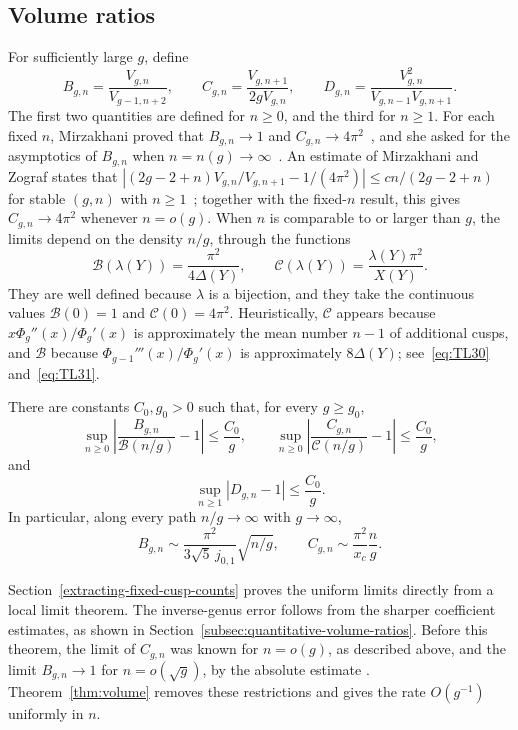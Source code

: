 \subsection{Volume ratios}\label{subsec:intro-ratios}
For sufficiently large $g$, define
\[
 B_{g,n}=\frac{V_{g,n}}{V_{g-1,n+2}},\qquad
 C_{g,n}=\frac{V_{g,n+1}}{2gV_{g,n}},\qquad
 D_{g,n}=\frac{V_{g,n}^2}{V_{g,n-1}V_{g,n+1}}.
\]
The first two quantities are defined for $n\ge0$, and the third for $n\ge1$. For each fixed $n$, Mirzakhani proved that $B_{g,n}\to1$ and $C_{g,n}\to4\pi^2$~\cite[Theorem~3.5]{Mir}, and she asked for the asymptotics of $B_{g,n}$ when $n=n(g)\to\infty$~\cite[Section~1.4]{Mir}. An estimate of Mirzakhani and Zograf states that $|(2g-2+n)V_{g,n}/V_{g,n+1}-1/(4\pi^2)|\le cn/(2g-2+n)$ for stable $(g,n)$ with $n\ge1$~\cite[Lemma~5.1]{MZ}; together with the fixed-$n$ result, this gives $C_{g,n}\to4\pi^2$ whenever $n=o(g)$. When $n$ is comparable to or larger than $g$, the limits depend on the density $n/g$, through the functions
\begin{equation}
 \mathcal B(\lambda(Y))=\frac{\pi^2}{4\Delta(Y)},\qquad
 \mathcal C(\lambda(Y))=\frac{\lambda(Y)\pi^2}{X(Y)}.
 \label{eq:SP3}
\end{equation}
They are well defined because $\lambda$ is a bijection, and they take the continuous values $\mathcal B(0)=1$ and $\mathcal C(0)=4\pi^2$. Heuristically, $\mathcal C$ appears because $x\Phi_g''(x)/\Phi_g'(x)$ is approximately the mean number $n-1$ of additional cusps, and $\mathcal B$ because $\Phi_{g-1}'''(x)/\Phi_g'(x)$ is approximately $8\Delta(Y)$; see~\eqref{eq:TL30} and~\eqref{eq:TL31}.

\begin{mainresult}
\begin{theorem}\label{thm:volume}
There are constants $C_0,g_0>0$ such that, for every $g\ge g_0$,
\[
 \sup_{n\ge0}\left|\frac{B_{g,n}}{\mathcal B(n/g)}-1\right|\le\frac{C_0}{g},
 \qquad
 \sup_{n\ge0}\left|\frac{C_{g,n}}{\mathcal C(n/g)}-1\right|\le\frac{C_0}{g},
\]
and
\[
 \sup_{n\ge1}|D_{g,n}-1|\le\frac{C_0}{g}.
\]
In particular, along every path $n/g\to\infty$ with $g\to\infty$,
\[
 B_{g,n}\sim\frac{\pi^2}{3\sqrt5\,j_{0,1}}\sqrt{n/g},\qquad
 C_{g,n}\sim\frac{\pi^2}{x_c}\frac ng.
\]
\end{theorem}
\end{mainresult}
Section~\ref{extracting-fixed-cusp-counts} proves the uniform limits directly from a local limit theorem. The inverse-genus error follows from the sharper coefficient estimates, as shown in Section~\ref{subsec:quantitative-volume-ratios}. Before this theorem, the limit of $C_{g,n}$ was known for $n=o(g)$, as described above, and the limit $B_{g,n}\to1$ for $n=o(\sqrt g)$, by the absolute estimate \cite[Theorem~1.8]{MZ}. Theorem~\ref{thm:volume} removes these restrictions and gives the rate $O(g^{-1})$ uniformly in $n$.

